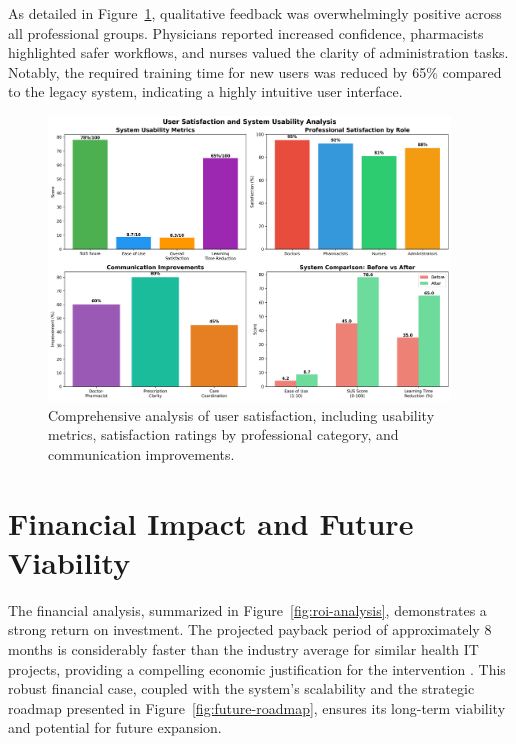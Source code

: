 As detailed in Figure~\ref{fig:user-satisfaction}, qualitative feedback was overwhelmingly positive across all professional groups. Physicians reported increased confidence, pharmacists highlighted safer workflows, and nurses valued the clarity of administration tasks. Notably, the required training time for new users was reduced by 65\% compared to the legacy system, indicating a highly intuitive user interface.

\begin{figure}[htbp]
    \centering
    \includegraphics[width=0.95\textwidth]{images/generated/user_satisfaction.png}
    \caption{Comprehensive analysis of user satisfaction, including usability metrics, satisfaction ratings by professional category, and communication improvements.}
    \label{fig:user-satisfaction}
\end{figure}

\section{Financial Impact and Future Viability}

The financial analysis, summarized in Figure~\ref{fig:roi-analysis}, demonstrates a strong return on investment. The projected payback period of approximately 8 months is considerably faster than the industry average for similar health IT projects, providing a compelling economic justification for the intervention \cite{adler2021}. This robust financial case, coupled with the system's scalability and the strategic roadmap presented in Figure~\ref{fig:future-roadmap}, ensures its long-term viability and potential for future expansion.

